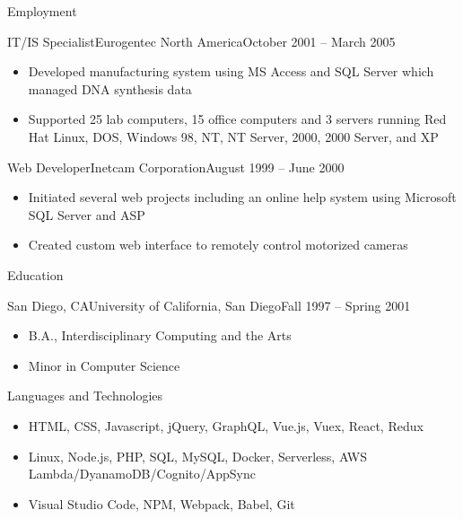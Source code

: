 \documentclass[calibri]{fullstack}
\begin{document}
\begin{cvsection}{Employment}
		\begin{cvsubsection}{IT/IS Specialist}{Eurogentec North America}{October 2001 -- March 2005}
			\begin{itemize}
				\item Developed manufacturing system using MS Access and SQL Server which managed DNA synthesis data
				\item Supported 25 lab computers, 15 office computers and 3 servers running Red Hat Linux, DOS, Windows 98, NT, NT Server, 2000, 2000 Server, and XP
			\end{itemize}
		\end{cvsubsection}

		\begin{cvsubsection}{Web Developer}{Inetcam Corporation}{August 1999 -- June 2000}
			\begin{itemize}
				\item Initiated several web projects including an online help system using Microsoft SQL Server and ASP
				\item Created custom web interface to remotely control motorized cameras
			\end{itemize}
		\end{cvsubsection}
	\end{cvsection}

	\begin{cvsection}{Education}
		\begin{cvsubsection}{San Diego, CA}{University of California, San Diego}{Fall 1997 -- Spring 2001}
			\begin{itemize}
				\item B.A., Interdisciplinary Computing and the Arts
				\item Minor in Computer Science
			\end{itemize}
		\end{cvsubsection}
	\end{cvsection}

	\begin{cvsection}{Languages and Technologies}
		\begin{cvsubsection}{}{}{}
			\begin{itemize}
				\item HTML, CSS, Javascript, jQuery, GraphQL, Vue.js, Vuex, React, Redux
				\item Linux, Node.js, PHP, SQL, MySQL, Docker, Serverless, AWS Lambda/DyanamoDB/Cognito/AppSync
				\item Visual Studio Code, NPM, Webpack, Babel, Git
			\end{itemize}
		\end{cvsubsection}
	\end{cvsection}
\end{document}
